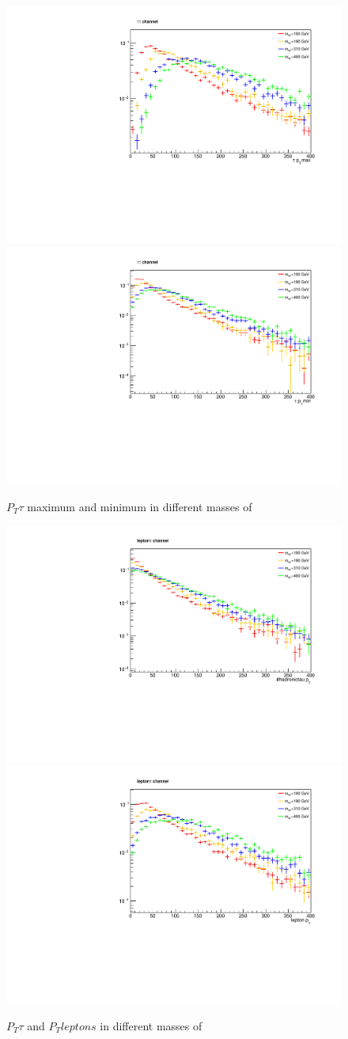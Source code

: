   
\begin{figure}[!ht]
\centering
\includegraphics*[width=.45\textwidth]{figs/PT-max.pdf}
\hspace{3mm}
\includegraphics*[width=.45\textwidth]{figs/PT-min.pdf}
\caption{$P_T {\tau}$ maximum and minimum in different masses of \wprime }
\label{pt-hh}
\end{figure}

  

\begin{figure}[!ht]
\centering
\includegraphics*[width=.45\textwidth]{figs/PT-lh.pdf}
\hspace{3mm}
\includegraphics*[width=.45\textwidth]{figs/PT-ll.pdf}
\caption{$P_T {\tau}$ and $P_T {leptons}$ in different masses of \wprime  }
\label{pt-lh}
\end{figure}

  
